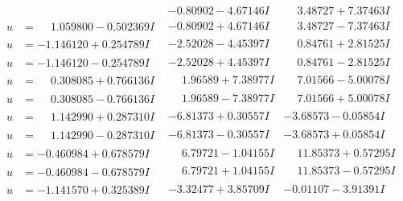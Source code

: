 \documentclass[1p]{elsarticle_modified}
\theoremstyle{definition}
\begin{document}
$$\begin{array}{c|c|c}
 & -0.80902 - 4.67146 I & \phantom{-}3.48727 + 7.37463 I \\ \hline\begin{aligned}
u &= \phantom{-}1.059800 - 0.502369 I\end{aligned}
 & -0.80902 + 4.67146 I & \phantom{-}3.48727 - 7.37463 I \\ \hline\begin{aligned}
u &= -1.146120 + 0.254789 I\end{aligned}
 & -2.52028 - 4.45397 I & \phantom{-}0.84761 + 2.81525 I \\ \hline\begin{aligned}
u &= -1.146120 - 0.254789 I\end{aligned}
 & -2.52028 + 4.45397 I & \phantom{-}0.84761 - 2.81525 I \\ \hline\begin{aligned}
u &= \phantom{-}0.308085 + 0.766136 I\end{aligned}
 & \phantom{-}1.96589 + 7.38977 I & \phantom{-}7.01566 - 5.00078 I \\ \hline\begin{aligned}
u &= \phantom{-}0.308085 - 0.766136 I\end{aligned}
 & \phantom{-}1.96589 - 7.38977 I & \phantom{-}7.01566 + 5.00078 I \\ \hline\begin{aligned}
u &= \phantom{-}1.142990 + 0.287310 I\end{aligned}
 & -6.81373 + 0.30557 I & -3.68573 - 0.05854 I \\ \hline\begin{aligned}
u &= \phantom{-}1.142990 - 0.287310 I\end{aligned}
 & -6.81373 - 0.30557 I & -3.68573 + 0.05854 I \\ \hline\begin{aligned}
u &= -0.460984 + 0.678579 I\end{aligned}
 & \phantom{-}6.79721 - 1.04155 I & \phantom{-}11.85373 + 0.57295 I \\ \hline\begin{aligned}
u &= -0.460984 - 0.678579 I\end{aligned}
 & \phantom{-}6.79721 + 1.04155 I & \phantom{-}11.85373 - 0.57295 I \\ \hline\begin{aligned}
u &= -1.141570 + 0.325389 I\end{aligned}
 & -3.32477 + 3.85709 I & -0.01107 - 3.91391 I \\ \hline\begin{aligned}

\end{aligned}
\end{array}$$
\end{document}
